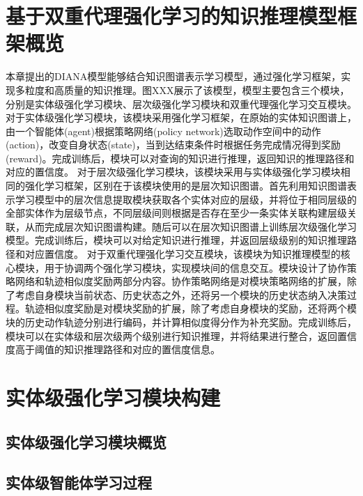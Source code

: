 \documentclass[algorithmlist, AutoFakeBold, AutoFakeSlant, figurelist, tablelist, nomlist, masters]{seuthesix}
\begin{document}
\section{基于双重代理强化学习的知识推理模型框架概览}
本章提出的DIANA模型能够结合知识图谱表示学习模型，通过强化学习框架，实现多粒度和高质量的知识推理。图XXX展示了该模型，模型主要包含三个模块，分别是实体级强化学习模块、层次级强化学习模块和双重代理强化学习交互模块。
对于实体级强化学习模块，该模块采用强化学习框架，在原始的实体知识图谱上，由一个智能体(agent)根据策略网络(policy network)选取动作空间中的动作(action)，改变自身状态(state)，当到达结束条件时根据任务完成情况得到奖励(reward)。完成训练后，模块可以对查询的知识进行推理，返回知识的推理路径和对应的置信度。
对于层次级强化学习模块，该模块采用与实体级强化学习模块相同的强化学习框架，区别在于该模块使用的是层次知识图谱。首先利用知识图谱表示学习模型中的层次信息提取模块获取各个实体对应的层级，并将位于相同层级的全部实体作为层级节点，不同层级间则根据是否存在至少一条实体关联构建层级关联，从而完成层次知识图谱构建。随后可以在层次知识图谱上训练层次级强化学习模型。完成训练后，模块可以对给定知识进行推理，并返回层级级别的知识推理路径和对应置信度。
对于双重代理强化学习交互模块，该模块为知识推理模型的核心模块，用于协调两个强化学习模块，实现模块间的信息交互。模块设计了协作策略网络和轨迹相似度奖励两部分内容。协作策略网络是对模块策略网络的扩展，除了考虑自身模块当前状态、历史状态之外，还将另一个模块的历史状态纳入决策过程。轨迹相似度奖励是对模块奖励的扩展，除了考虑自身模块的奖励，还将两个模块的历史动作轨迹分别进行编码，并计算相似度得分作为补充奖励。完成训练后，模块可以在实体级和层次级两个级别进行知识推理，并将结果进行整合，返回置信度高于阈值的知识推理路径和对应的置信度信息。

\section{实体级强化学习模块构建}


\subsection{实体级强化学习模块概览}


\subsection{实体级智能体学习过程}
\end{document}
